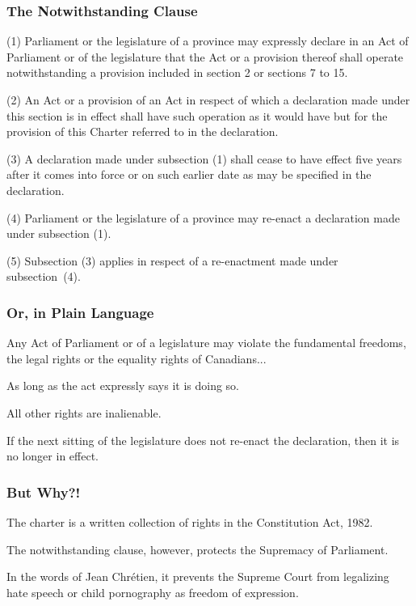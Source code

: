 \begin{frame}
\frametitle{The Notwithstanding Clause}

  (1) Parliament or the legislature of a province may expressly declare
	in an Act of Parliament or of the legislature that the Act or a provision 
	thereof shall operate notwithstanding a provision included in section 2 
	or sections 7 to 15.
  
	(2) An Act or a provision of an Act in respect of which a declaration 
	made under this section is in effect shall have such operation as it 
	would have but for the provision of this Charter referred to in the 
	declaration.
  
	(3) A declaration made under subsection (1) shall cease to have effect 
	five years after it comes into force or on such earlier date as may be 
	specified in the declaration.
  
		(4) Parliament or the legislature of a province may re-enact a 	declaration made under subsection (1).
  
		(5) Subsection (3) applies in respect of a re-enactment made under 
	subsection~(4).

\end{frame}



\begin{frame}
\frametitle{Or, in Plain Language}

Any Act of Parliament or of a legislature may violate the fundamental freedoms, the legal rights or the equality rights of Canadians... 

As long as the act expressly says it is doing so.

All other rights are inalienable.

If the next sitting of the legislature does not re-enact the declaration, then it is no longer in effect.

\end{frame}



\begin{frame}
\frametitle{But Why?!}

The charter is a written collection of rights in the Constitution Act, 1982.

The notwithstanding clause, however, protects the Supremacy of Parliament.

	In the words of Jean Chr\'etien, it prevents the Supreme Court from legalizing hate speech or child pornography as freedom of expression.

\end{frame}


